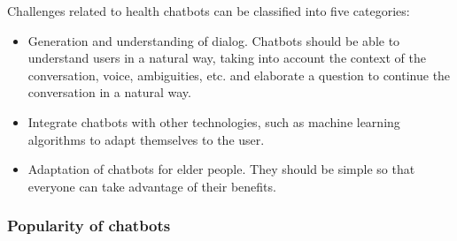 \documentclass[12pt,english]{article}
\begin{document}
Challenges related to health chatbots can be classified into five categories:
\begin{itemize}
  \item Generation and understanding of dialog. Chatbots should be able to understand users in a natural way, taking into account the context of the conversation, voice, ambiguities, etc. and elaborate a question to continue the conversation in a natural way.
  \item Integrate chatbots with other technologies, such as machine learning algorithms to adapt themselves to the user.
  \item Adaptation of chatbots for elder people. They should be simple so that everyone can take advantage of their benefits.
\end{itemize}

\subsubsection{Popularity of chatbots}
\end{document}
